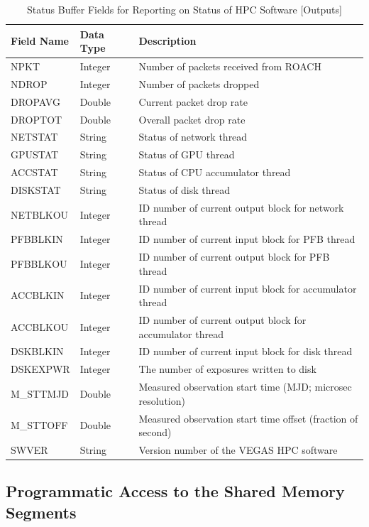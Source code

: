 \documentclass[11pt]{article} %
\begin{document}
\begin{table}[!h]
\centering
\caption{Status Buffer Fields for Reporting on Status of HPC Software [Outputs]}
\begin{tabular}{l l l}
\hline
\bf Field Name & \bf Data Type & \bf Description \\
\hline
NPKT & Integer & Number of packets received from ROACH \\ 
NDROP & Integer & Number of packets dropped \\ 
DROPAVG & Double & Current packet drop rate \\ 
DROPTOT & Double & Overall packet drop rate \\
NETSTAT & String & Status of network thread \\
GPUSTAT & String & Status of GPU thread \\
ACCSTAT & String & Status of CPU accumulator thread \\
DISKSTAT & String & Status of disk thread \\
NETBLKOU & Integer & ID number of current output block for network thread \\ 
PFBBLKIN & Integer & ID number of current input block for PFB thread \\ 
PFBBLKOU & Integer & ID number of current output block for PFB thread\\ 
ACCBLKIN & Integer & ID number of current input block for accumulator thread\\ 
ACCBLKOU & Integer & ID number of current output block for accumulator thread\\ 
DSKBLKIN & Integer & ID number of current input block for disk thread \\
DSKEXPWR & Integer & The number of exposures written to disk \\ 
M\_STTMJD & Double & Measured observation start time (MJD; microsec resolution)\\
M\_STTOFF & Double & Measured observation start time offset (fraction of second) \\
SWVER & String & Version number of the VEGAS HPC software \\
\hline
\end{tabular}
\label{status-buffer-monitor}
\end{table}

\subsection{Programmatic Access to the Shared Memory Segments}
\end{document}

